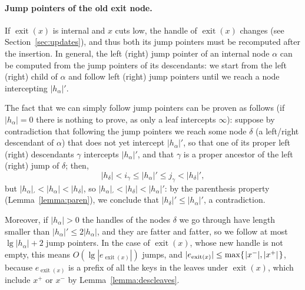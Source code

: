 \documentclass[a4paper]{article}
\newcommand{\exit}[1]{\operatorname{exit}(#1)}
\newcommand{\?}{\mskip1.5mu}
\begin{document}
\paragraph{Jump pointers of the old exit node.}
If $\exit x$ is internal and $x$ cuts low, the handle of $\exit x$ changes (see Section~\ref{sec:updates}), and thus both
its jump pointers must be recomputed after the insertion. In general, the left (right) jump pointer of an 
internal node $\alpha$ can be computed from the jump pointers of its descendants: we start from the left (right)
child of $\alpha$ and follow left (right) jump pointers until we reach a node intercepting $|h_\alpha|'$.

The fact that we can simply follow jump pointers can be proven as follows (if $|h_\alpha|=0$ there is nothing to prove, as only a leaf 
intercepts $\infty$): suppose by contradiction that
following the jump pointers we reach some node $\delta$ (a left/right descendant of $\alpha$) that does not yet intercept
$|h_\alpha|'$, so that one of its proper left (right) descendants
$\gamma$ intercepts $|h_\alpha|'$, and that $\gamma$ is a proper ancestor of the left (right) jump of $\delta$; then,
\[
	|h_\delta| < i_\gamma \leq |h_\alpha|'\leq j_\gamma  < |h_\delta|',
\]
but $|h_\alpha|_\prime<|h_\alpha|<|h_\delta|$, so $|h_\alpha|_\prime<|h_\delta|<|h_\alpha|'$: by the parenthesis property (Lemma~\ref{lemma:paren}),
we conclude that $|h_\delta|'\leq |h_\alpha|'$, a contradiction. 

Moreover, if $|h_\alpha|>0$ the handles of the nodes $\delta$ we go through have length smaller than $|h_\alpha|'\leq2|h_\alpha|$, and they are fatter and fatter,
so we follow at most $\lg|h_\alpha|+2$ jump pointers. In the case of $\exit x$, whose new handle is not empty, this means $O(\lg|e_{\exit x}|)$ jumps, and
$|e_{\exit x}|\leq\max\{\?|x^-|,|x^+|\?\}$, because $e_{\exit x}$ is a prefix of all the keys in the leaves under $\exit x$, 
which include $x^+$ or $x^-$ by Lemma~\ref{lemma:descleaves}.
\end{document}
